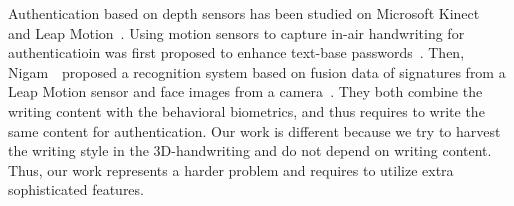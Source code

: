 
Authentication based on depth sensors has been studied on Microsoft Kinect~\cite{GaitKinectMS,Hayashi2014:WMU} and Leap Motion~\cite{Aslan14:LeapMidAirGesture, ICDAR15:OnlineHandwriting}.
Using motion sensors to capture in-air handwriting for authenticatioin was first proposed to enhance text-base passwords~\cite{TianQXW13:NDSS13}. Then, Nigam~\etal ~proposed a recognition system based on fusion data of signatures from a Leap Motion sensor and face images from a camera~\cite{Nigam15:LeapSigVeri}. They both combine the writing content with the behavioral biometrics, and thus requires to write the same content for authentication.  
Our work is different because we try to harvest the writing style in the 3D-handwriting and do not depend on writing content. Thus, our work represents a harder problem and requires to utilize extra sophisticated features. 



